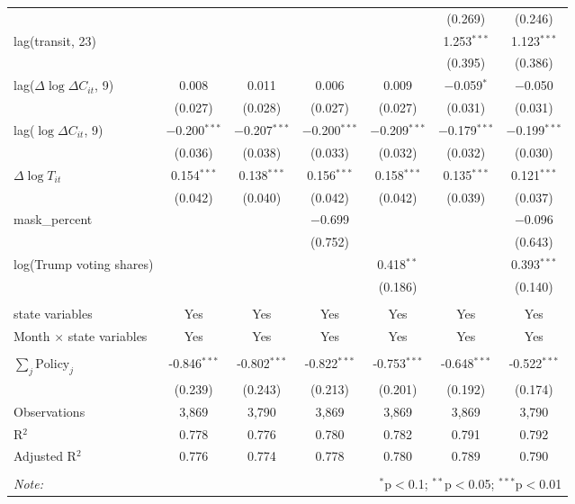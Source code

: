 \begin{tabular}{@{\extracolsep{1pt}}lcccccc}
  &  &  &  &  & (0.269) & (0.246) \\ 
  lag(transit, 23) &  &  &  &  & 1.253$^{***}$ & 1.123$^{***}$ \\ 
  &  &  &  &  & (0.395) & (0.386) \\ 
  lag($\Delta \log \Delta C_{it}$, 9) & 0.008 & 0.011 & 0.006 & 0.009 & $-$0.059$^{*}$ & $-$0.050 \\ 
  & (0.027) & (0.028) & (0.027) & (0.027) & (0.031) & (0.031) \\ 
  lag($\log \Delta C_{it}$, 9) & $-$0.200$^{***}$ & $-$0.207$^{***}$ & $-$0.200$^{***}$ & $-$0.209$^{***}$ & $-$0.179$^{***}$ & $-$0.199$^{***}$ \\ 
  & (0.036) & (0.038) & (0.033) & (0.032) & (0.032) & (0.030) \\ 
  $\Delta \log T_{it}$ & 0.154$^{***}$ & 0.138$^{***}$ & 0.156$^{***}$ & 0.158$^{***}$ & 0.135$^{***}$ & 0.121$^{***}$ \\ 
  & (0.042) & (0.040) & (0.042) & (0.042) & (0.039) & (0.037) \\ 
  mask\_percent &  &  & $-$0.699 &  &  & $-$0.096 \\ 
  &  &  & (0.752) &  &  & (0.643) \\ 
  log(Trump voting shares) &  &  &  & 0.418$^{**}$ &  & 0.393$^{***}$ \\ 
  &  &  &  & (0.186) &  & (0.140) \\ 
 \hline \\[-1.8ex] 
state variables & Yes & Yes & Yes & Yes & Yes & Yes \\ 
Month $\times$ state variables & Yes & Yes & Yes & Yes & Yes & Yes \\ 
\hline \\[-1.8ex] 
$\sum_j \mathrm{Policy}_j$ & -0.846$^{***}$ & -0.802$^{***}$ & -0.822$^{***}$ & -0.753$^{***}$ & -0.648$^{***}$ & -0.522$^{***}$ \\ 
 & (0.239) & (0.243) & (0.213) & (0.201) & (0.192) & (0.174) \\ 
Observations & 3,869 & 3,790 & 3,869 & 3,869 & 3,869 & 3,790 \\ 
R$^{2}$ & 0.778 & 0.776 & 0.780 & 0.782 & 0.791 & 0.792 \\ 
Adjusted R$^{2}$ & 0.776 & 0.774 & 0.778 & 0.780 & 0.789 & 0.790 \\ 
\hline 
\hline \\[-1.8ex] 
\textit{Note:}  & \multicolumn{6}{r}{$^{*}$p$<$0.1; $^{**}$p$<$0.05; $^{***}$p$<$0.01} \\ 
\end{tabular} 